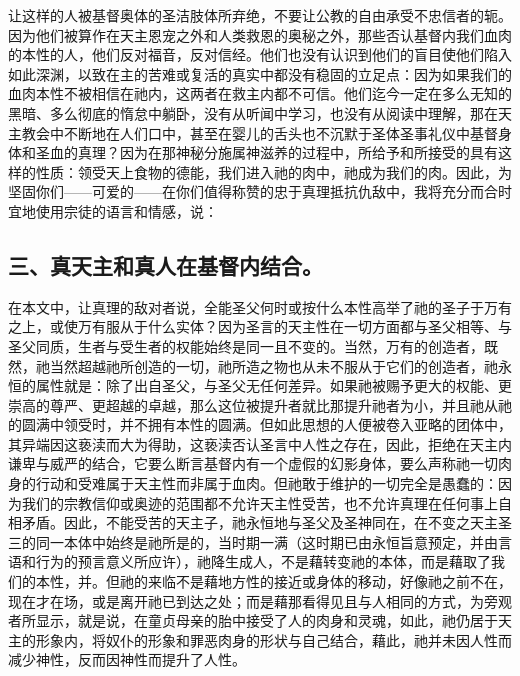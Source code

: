 让这样的人被基督奥体的圣洁肢体所弃绝，不要让公教的自由承受不忠信者的轭。因为他们被算作在天主恩宠之外和人类救恩的奥秘之外，那些否认基督内我们血肉的本性的人，他们反对福音，反对信经。他们也没有认识到他们的盲目使他们陷入如此深渊，以致在主的苦难或复活的真实中都没有稳固的立足点：因为如果我们的血肉本性不被相信在祂内，这两者在救主内都不可信。他们迄今一定在多么无知的黑暗、多么彻底的惰怠中躺卧，没有从听闻中学习，也没有从阅读中理解，那在天主教会中不断地在人们口中，甚至在婴儿的舌头也不沉默于圣体圣事礼仪中基督身体和圣血的真理？因为在那神秘分施属神滋养的过程中，所给予和所接受的具有这样的性质：领受天上食物的德能，我们进入祂的肉中，祂成为我们的肉。因此，为坚固你们——可爱的——在你们值得称赞的忠于真理抵抗仇敌中，我将充分而合时宜地使用宗徒的语言和情感，说：\par


\subsection{三、真天主和真人在基督内结合。}

在本文中，让真理的敌对者说，全能圣父何时或按什么本性高举了祂的圣子于万有之上，或使万有服从于什么实体？因为圣言的天主性在一切方面都与圣父相等、与圣父同质，生者与受生者的权能始终是同一且不变的。当然，万有的创造者，既然，祂当然超越祂所创造的一切，祂所造之物也从未不服从于它们的创造者，祂永恒的属性就是：除了出自圣父，与圣父无任何差异。如果祂被赐予更大的权能、更崇高的尊严、更超越的卓越，那么这位被提升者就比那提升祂者为小，并且祂从祂的圆满中领受时，并不拥有本性的圆满。但如此思想的人便被卷入亚略的团体中，其异端因这亵渎而大为得助，这亵渎否认圣言中人性之存在，因此，拒绝在天主内谦卑与威严的结合，它要么断言基督内有一个虚假的幻影身体，要么声称祂一切肉身的行动和受难属于天主性而非属于血肉。但祂敢于维护的一切完全是愚蠢的：因为我们的宗教信仰或奥迹的范围都不允许天主性受苦，也不允许真理在任何事上自相矛盾。因此，不能受苦的天主子，祂永恒地与圣父及圣神同在，在不变之天主圣三的同一本体中始终是祂所是的，当时期一满（这时期已由永恒旨意预定，并由言语和行为的预言意义所应许），祂降生成人，不是藉转变祂的本体，而是藉取了我们的本性，并。但祂的来临不是藉地方性的接近或身体的移动，好像祂之前不在，现在才在场，或是离开祂已到达之处；而是藉那看得见且与人相同的方式，为旁观者所显示，就是说，在童贞母亲的胎中接受了人的肉身和灵魂，如此，祂仍居于天主的形象内，将奴仆的形象和罪恶肉身的形状与自己结合，藉此，祂并未因人性而减少神性，反而因神性而提升了人性。\par

